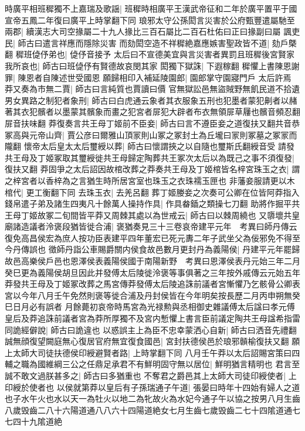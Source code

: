 時廣平相班穉獨不上嘉瑞及歌謡|{
	班穉時相廣平王漢武帝征和二年於廣平置平于國宣帝五鳳二年復曰廣平上時掌翻下同}
琅邪太守公孫閎言災害於公府甄豐遣屬馳至兩郡|{
	續漢志大司空掾屬二十九人掾比三百石屬比二百石杜佑曰正曰掾副曰屬}
諷吏民|{
	師古曰遣言祥應而隱除災害}
而劾閎空造不祥穉絶嘉應嫉害聖政皆不道|{
	劾戶槩翻}
穉班偼伃弟也|{
	偼伃音接予}
太后曰不宣德美宜與言災害者異罰且班穉後宮賢家我所哀也|{
	師古曰班偼伃有賢德故哀閔其家}
閎獨下獄誅|{
	下遐稼翻}
穉懼上書陳恩謝罪|{
	陳恩者自陳述世受國恩}
願歸相印入補延陵園郎|{
	園郎掌守園寢門戶}
太后許焉　莽又奏為市無二賈|{
	師古曰言純質也賈讀曰價}
官無獄訟邑無盜賊野無飢民道不拾遺男女異路之制犯者象刑|{
	師古曰白虎通云象者其衣服象五刑也犯墨者蒙犯劓者以赭著其衣犯髕者以墨蒙其髕象而畫之犯宮者屝犯大辟者布衣無領屝草屨也髕音頻忍翻屝音扶味翻}
莽復奏言共王母丁姬前不臣妾|{
	師古曰言不遵臣妾之道復扶又翻共音恭}
冢高與元帝山齊|{
	賈公彦曰爾雅山頂冡則山冢之冢封土為丘壠曰冡則冢墓之冢冡而隴翻}
懷帝太后皇太太后璽綬以葬|{
	師古曰懷謂挾之以自隨也璽斯氏翻綬音受}
請發共王母及丁姬冢取其璽綬徙共王母歸定陶葬共王冢次太后以為既己之事不須復發|{
	復扶又翻}
莽固爭之太后詔因故棺改葬之莽奏共王母及丁姬棺皆名梓宮珠玉之衣|{
	謂之梓宮者以香梓為之言猶生時所居宮室也珠玉之衣珠襦玉匣也}
非藩妾服請更以木棺代|{
	更工衡翻下同}
去珠玉衣|{
	去羌呂翻}
葬丁姬媵妾之次奏可公卿在位皆阿莽指入錢帛遣子弟及諸生四夷凡十餘萬人操持作具|{
	作具畚鍤之類操七刀翻}
助將作掘平共王母丁姬故冢二旬間皆平莽又周棘其處以為世戒云|{
	師古曰以棘周繞也}
又隳壞共皇廟諸造議者泠褒段猶皆徙合浦|{
	褒猶奏見三十三卷哀帝建平元年　考異曰師丹傳云復免高昌侯宏為庶人按功臣表建平四年董宏已死元夀二年子武坐父為佞邪免不得至今丹傳誤也}
徵師丹詣公車賜爵關内侯食故邑數月更封丹為義陽侯|{
	丹建平元年罷歸故邑高樂侯戶邑也恩澤侯表義陽侯國于南陽新野　考異曰恩澤侯表丹元始三年二月癸巳更為義陽侯胡旦因此并發傅太后陵徙泠褒等事俱著之三年按外戚傳云元始五年莽發共王母及丁姬冢改葬之馬宮傳莽發傅太后陵追誅前議者宮慚懼乃乞骸骨公卿表宮以今年八月壬午免然則褒等徙合浦及丹封侯皆在今年明矣按長歷二月丙申朔無癸巳日月必有誤者}
月餘薨初哀帝時馬宮為光禄勲與丞相御史雜議傅太后諡曰孝元傅皇后及莽追誅前議者宮為莽所厚獨不及宮内慙懼上書言臣前議定陶共王母諡希指雷同詭經僻說|{
	師古曰詭違也}
以惑誤主上為臣不忠幸蒙洒心自新|{
	師古曰洒音先禮翻}
誠無顔復望闕庭無心復居官府無宜復食國邑|{
	宮封扶德侯邑於琅邪贑榆復扶又翻}
願上太師大司徒扶德侯印綬避賢者路|{
	上時掌翻下同}
八月壬午莽以太后詔賜宮策曰四輔之職為國維綱三公之任鼎足承君不有鮮明固守無以居位|{
	鮮明猶言精明也}
君言至誠不敢文過朕甚多之|{
	師古曰多猶重也}
不奪君之爵邑其上太師大司徒印綬使者|{
	上印綬於使者也}
以侯就第莽以皇后有子孫瑞通子午道|{
	張晏曰時年十四始有婦人之道也子水午火也水以天一為牡火以地二為牝故火為水妃今通子午以協之按男八月生齒八歲毁齒二八十六陽道通八八六十四陽道絶女七月生齒七歲毁齒二七十四隂道通七七四十九隂道絶}
